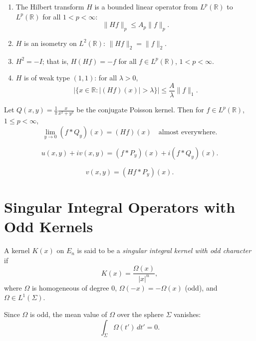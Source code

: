 \begin{theorem}\label{thm:c6-1-4}
\begin{enumerate}
\item[(a)] The Hilbert transform $H$ is a bounded linear operator from $L^p(\mathbb{R})$ to $L^p(\mathbb{R})$ for all $1 < p < \infty$:
\[
\|Hf\|_p \leq A_p \|f\|_p.
\]
\item[(b)] $H$ is an isometry on $L^2(\mathbb{R})$: $\|Hf\|_2 = \|f\|_2$.
\item[(c)] $H^2 = -I$; that is, $H(Hf) = -f$ for all $f \in L^p(\mathbb{R})$, $1 < p < \infty$.
\item[(d)] $H$ is of weak type $(1, 1)$: for all $\lambda > 0$,
\[
|\{x \in \mathbb{R} : |(Hf)(x)| > \lambda\}| \leq \frac{A}{\lambda} \|f\|_1.
\]
\end{enumerate}
\end{theorem}

\begin{lemma}\label{lem:c6-1-5}
Let $Q(x, y) = \frac{1}{\pi} \frac{x}{x^2 + y^2}$ be the conjugate Poisson kernel. Then for $f \in L^p(\mathbb{R})$, $1 \leq p < \infty$,
\begin{equation}\label{eq:c6-1-6}
\lim_{y \to 0} (f * Q_y)(x) = (Hf)(x) \quad \text{almost everywhere}.
\end{equation}
\end{lemma}

\begin{equation}\label{eq:c6-1-7}
u(x, y) + i v(x, y) = (f * P_y)(x) + i (f * Q_y)(x).
\end{equation}

\begin{equation}\label{eq:c6-1-8}
v(x, y) = (Hf * P_y)(x).
\end{equation}

\section{Singular Integral Operators with Odd Kernels}

A kernel $K(x)$ on $E_n$ is said to be a \emph{singular integral kernel with odd character} if
\begin{equation}\label{eq:c6-2-1}
K(x) = \frac{\Omega(x)}{|x|^n},
\end{equation}
where $\Omega$ is homogeneous of degree $0$, $\Omega(-x) = -\Omega(x)$ (odd), and $\Omega \in L^1(\Sigma)$.

\begin{lemma}\label{lem:c6-2-2}
Since $\Omega$ is odd, the mean value of $\Omega$ over the sphere $\Sigma$ vanishes:
\begin{equation}\label{eq:c6-2-3}
\int_\Sigma \Omega(t')\,dt' = 0.
\end{equation}
\end{lemma}


